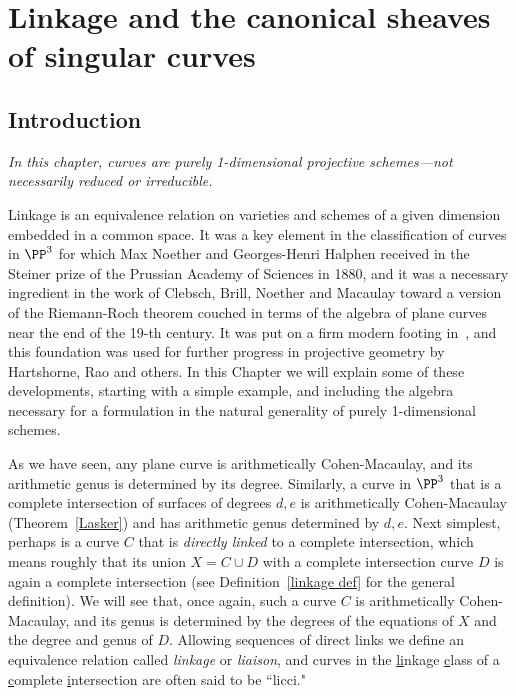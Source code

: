 

\chapter{Linkage and the canonical sheaves of singular curves}
\label{LiaisonChapter}\label{linkageChapter}\label{LinkageChapter}


\section{Introduction} \label{LinkageIntro}

\emph{In this chapter, curves are purely 1-dimensional projective schemes---not necessarily reduced or irreducible.}

Linkage is an equivalence relation on varieties and schemes of a given dimension embedded in a common space. It was a key element
in the classification of curves in $\PP^3$ for which Max Noether and  Georges-Henri Halphen received in the Steiner prize of the Prussian Academy of Sciences in 1880, and it was a necessary ingredient in the work of Clebsch, Brill, Noether and Macaulay toward
a version of the Riemann-Roch theorem couched in terms of the algebra of plane curves near the end of the 19-th century. 
It was put on a firm modern footing in~\cite{MR364271}, and this foundation was used for further progress in projective geometry by Hartshorne, Rao and others. In this Chapter we will explain some of these developments, starting with a simple example,
and including the algebra necessary for a formulation in the natural generality of purely 1-dimensional schemes.

As we have seen, any plane curve is arithmetically Cohen-Macaulay, and its arithmetic genus is determined by its degree. Similarly, a curve in  $\PP^3$ that is a complete intersection of surfaces of degrees $d,e$
is arithmetically Cohen-Macaulay (Theorem~\ref{Lasker}) and has arithmetic genus determined by $d,e$.
 Next simplest, perhaps
is a curve $C$ that is \emph{directly linked} to a complete intersection, which means roughly that its union $X = C\cup D$
with a complete intersection
curve $D$ is again a complete intersection (see Definition~\ref{linkage def} for the general definition). We will see that, once again, such a curve $C$ is arithmetically Cohen-Macaulay,
and its genus is determined by the degrees of the equations of $X$ and the degree and genus of $D$. 
Allowing sequences of direct links we define an equivalence relation called  \emph{linkage} or \emph{liaison}, 
and curves in the \underline{li}nkage {\underline c}lass of a {\underline c}omplete {\underline i}ntersection are often said to be ``licci." 

